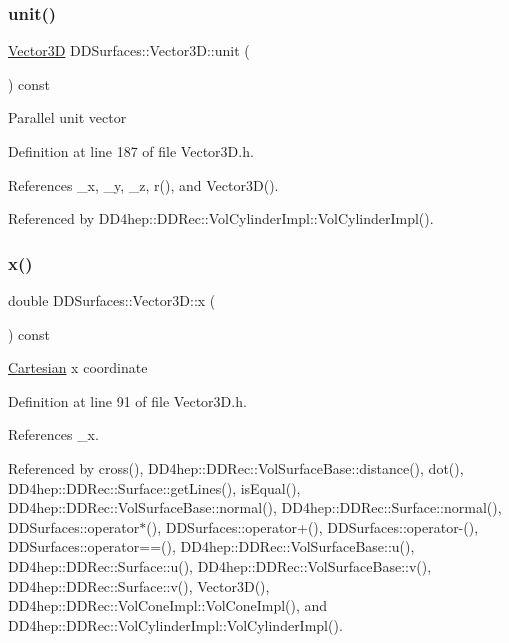 \subsubsection{\texorpdfstring{unit()}{unit()}}
{\footnotesize\ttfamily \hyperlink{class_d_d_surfaces_1_1_vector3_d}{Vector3D} D\+D\+Surfaces\+::\+Vector3\+D\+::unit (\begin{DoxyParamCaption}{ }\end{DoxyParamCaption}) const\hspace{0.3cm}{\ttfamily [inline]}}

Parallel unit vector 

Definition at line 187 of file Vector3\+D.\+h.



References \+\_\+x, \+\_\+y, \+\_\+z, r(), and Vector3\+D().



Referenced by D\+D4hep\+::\+D\+D\+Rec\+::\+Vol\+Cylinder\+Impl\+::\+Vol\+Cylinder\+Impl().

\hypertarget{class_d_d_surfaces_1_1_vector3_d_a08e4c3ffc5f8b352a7913bc131b1ffa6}{}\label{class_d_d_surfaces_1_1_vector3_d_a08e4c3ffc5f8b352a7913bc131b1ffa6} 
\subsubsection{\texorpdfstring{x()}{x()}\hspace{0.1cm}{\footnotesize\ttfamily [1/2]}}
{\footnotesize\ttfamily double D\+D\+Surfaces\+::\+Vector3\+D\+::x (\begin{DoxyParamCaption}{ }\end{DoxyParamCaption}) const\hspace{0.3cm}{\ttfamily [inline]}}

\hyperlink{struct_d_d_surfaces_1_1_vector3_d_1_1_cartesian}{Cartesian} x coordinate 

Definition at line 91 of file Vector3\+D.\+h.



References \+\_\+x.



Referenced by cross(), D\+D4hep\+::\+D\+D\+Rec\+::\+Vol\+Surface\+Base\+::distance(), dot(), D\+D4hep\+::\+D\+D\+Rec\+::\+Surface\+::get\+Lines(), is\+Equal(), D\+D4hep\+::\+D\+D\+Rec\+::\+Vol\+Surface\+Base\+::normal(), D\+D4hep\+::\+D\+D\+Rec\+::\+Surface\+::normal(), D\+D\+Surfaces\+::operator$\ast$(), D\+D\+Surfaces\+::operator+(), D\+D\+Surfaces\+::operator-\/(), D\+D\+Surfaces\+::operator==(), D\+D4hep\+::\+D\+D\+Rec\+::\+Vol\+Surface\+Base\+::u(), D\+D4hep\+::\+D\+D\+Rec\+::\+Surface\+::u(), D\+D4hep\+::\+D\+D\+Rec\+::\+Vol\+Surface\+Base\+::v(), D\+D4hep\+::\+D\+D\+Rec\+::\+Surface\+::v(), Vector3\+D(), D\+D4hep\+::\+D\+D\+Rec\+::\+Vol\+Cone\+Impl\+::\+Vol\+Cone\+Impl(), and D\+D4hep\+::\+D\+D\+Rec\+::\+Vol\+Cylinder\+Impl\+::\+Vol\+Cylinder\+Impl().

